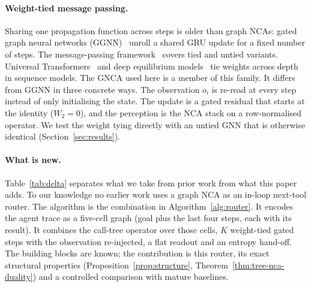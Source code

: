 \documentclass[10pt,twocolumn,letterpaper]{article}
\begin{document}
\paragraph{Weight-tied message passing.} Sharing one propagation function across steps is older than graph NCAs: gated graph neural networks (GGNN)~\cite{li2016ggnn} unroll a shared GRU update for a fixed number of steps. The message-passing framework~\cite{gilmer2017mpnn} covers tied and untied variants. Universal Transformers~\cite{dehghani2019universal} and deep equilibrium models~\cite{bai2019deq} tie weights across depth in sequence models. The GNCA used here is a member of this family. It differs from GGNN in three concrete ways. The observation $o_i$ is re-read at every step instead of only initialising the state. The update is a gated residual that starts at the identity ($W_2{=}0$), and the perception is the NCA stack on a row-normalised operator. We test the weight tying directly with an untied GNN that is otherwise identical (Section~\ref{sec:results}).
\paragraph{What is new.} Table~\ref{tab:delta} separates what we take from prior work from what this paper adds. To our knowledge no earlier work uses a graph NCA as an in-loop next-tool router. The algorithm is the combination in Algorithm~\ref{alg:router}. It encodes the agent trace as a five-cell graph (goal plus the last four steps, each with its result). It combines the call-tree operator over those cells, $K$ weight-tied gated steps with the observation re-injected, a flat readout and an entropy hand-off. The building blocks are known; the contribution is this router, its exact structural properties (Proposition~\ref{prop:structure}, Theorem~\ref{thm:tree-nca-duality}) and a controlled comparison with mature baselines.
\end{document}

